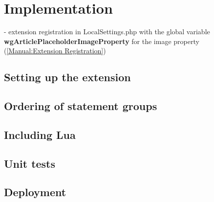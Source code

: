 	\section{Implementation}
	
	- extension registration in LocalSettings.php with the global variable \textbf{wgArticlePlaceholderImageProperty} for the image property (\href{https://www.mediawiki.org/wiki/Manual:Extension_registration}{[Manual:Extension Registration]})\\
	\subsection{Setting up the extension}
	
	
	
	\subsection{Ordering of statement groups}
	\subsection{Including Lua}
	
	\subsection{Unit tests}
	\subsection{Deployment}
	